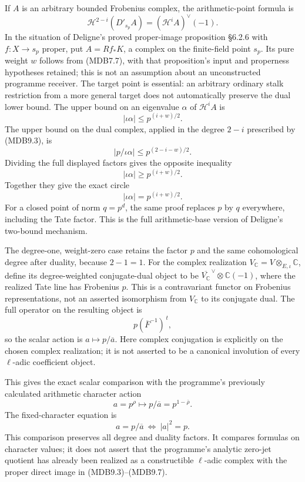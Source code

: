 \documentclass[
]{report}
\begin{document}
If \(A\) is an arbitrary bounded Frobenius complex, the arithmetic-point
formula is \[
\mathcal H^{2-i}(D'_{s_p}A)
=(\mathcal H^i A)^\vee(-1).
\tag{MDB9.3}
\] In the situation of Deligne's proved proper-image proposition §6.2.6
with \(f:X\to s_p\) proper, put \(A=Rf_*K\), a complex on the
finite-field point \(s_p\). Its pure weight \(w\) follows from (MDB7.7),
with that proposition's input and properness hypotheses retained; this
is not an assumption about an unconstructed programme receiver. The
target point is essential: an arbitrary ordinary stalk restriction from
a more general target does not automatically preserve the dual lower
bound. The upper bound on an eigenvalue \(\alpha\) of \(\mathcal H^iA\)
is \[
|\iota\alpha|\leq p^{(i+w)/2}.
\tag{MDB9.4}
\] The upper bound on the dual complex, applied in the degree \(2-i\)
prescribed by (MDB9.3), is \[
|p/\iota\alpha|\leq p^{(2-i-w)/2}.
\tag{MDB9.5}
\] Dividing the full displayed factors gives the opposite inequality \[
|\iota\alpha|\geq p^{(i+w)/2}.
\tag{MDB9.6}
\] Together they give the exact circle \[
|\iota\alpha|=p^{(i+w)/2}.
\tag{MDB9.7}
\] For a closed point of norm \(q=p^d\), the same proof replaces \(p\)
by \(q\) everywhere, including the Tate factor. This is the full
arithmetic-base version of Deligne's two-bound mechanism.

The degree-one, weight-zero case retains the factor \(p\) and the same
cohomological degree after duality, because \(2-1=1\). For the complex
realization \(V_{\mathbb C}=V\otimes_{E,\iota}\mathbb C\), define its
degree-weighted conjugate-dual object to be
\(\overline{V_{\mathbb C}}^{\,\vee}\otimes\mathbb C(-1)\), where the
realized Tate line has Frobenius \(p\). This is a contravariant functor
on Frobenius representations, not an asserted isomorphism from
\(V_{\mathbb C}\) to its conjugate dual. The full operator on the
resulting object is \[
p(\overline F^{-1})^{\,t},
\tag{MDB9.8}
\] so the scalar action is \(a\mapsto p/\overline a\). Here complex
conjugation is explicitly on the chosen complex realization; it is not
asserted to be a canonical involution of every \(\ell\)-adic coefficient
object.

This gives the exact scalar comparison with the programme's previously
calculated arithmetic character action \[
a=p^\rho\longmapsto p/\overline a=p^{1-\overline\rho}.
\tag{MDB9.9}
\] The fixed-character equation is \[
a=p/\overline a
\ \Longleftrightarrow\ |a|^2=p.
\tag{MDB9.10}
\] This comparison preserves all degree and duality factors. It compares
formulas on character values; it does not assert that the programme's
analytic zero-jet quotient has already been realized as a constructible
\(\ell\)-adic complex with the proper direct image in
(MDB9.3)--(MDB9.7).
\end{document}
